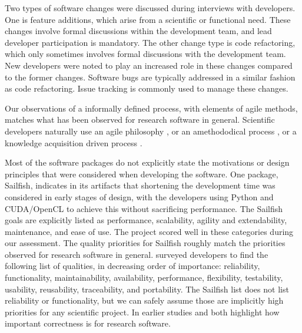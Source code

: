 \documentclass[runningheads]{llncs}
\begin{document}
Two types of software changes were discussed during interviews with developers.
One is feature additions, which arise from a scientific or functional need.
These changes involve formal discussions within the development team, and lead
developer participation is mandatory. The other change type is code refactoring,
which only sometimes involves formal discussions with the development team. New
developers were noted to play an increased role in these changes compared to the
former changes. Software bugs are typically addressed in a similar fashion as
code refactoring.  Issue tracking is commonly used to manage these changes.

Our observations of a informally defined process, with elements of agile
methods, matches what has been observed for research software in general.
Scientific developers naturally use an agile philosophy \cite{AckroydEtAl2008,CarverEtAl2007,EasterbrookAndJohns2009,Segal2005,HeatonAndCarver2015}, or an
amethododical process \cite{Kelly2013}, or a knowledge acquisition driven
process \cite{Kelly2015}.

Most of the software packages do not explicitly state the motivations or design
principles that were considered when developing the software. One package,
Sailfish, indicates in its artifacts that shortening the development time was
considered in early stages of design, with the developers using Python and
CUDA/OpenCL to achieve this without sacrificing performance. The Sailfish goals
are explicitly listed as performance, scalability, agility and extendability,
maintenance, and ease of use. The project scored well in these categories during
our assessment.  The quality priorities for Sailfish roughly match the
priorities observed for research software in general.
\cite{Nguyen-HoanEtAl2010} surveyed developers to find the following list of
qualities, in decreasing order of importance: reliability, functionality,
maintainability, availability, performance, flexibility, testability, usability,
reusability, traceability, and portability. The Sailfish list does not list
reliability or functionality, but we can safely assume those are implicitly high
priorities for any scientific project.  In earlier studies
\cite{KellyAndSanders2008} and \cite{CarverEtAl2007} both highlight how
important correctness is for research software.
\end{document}

